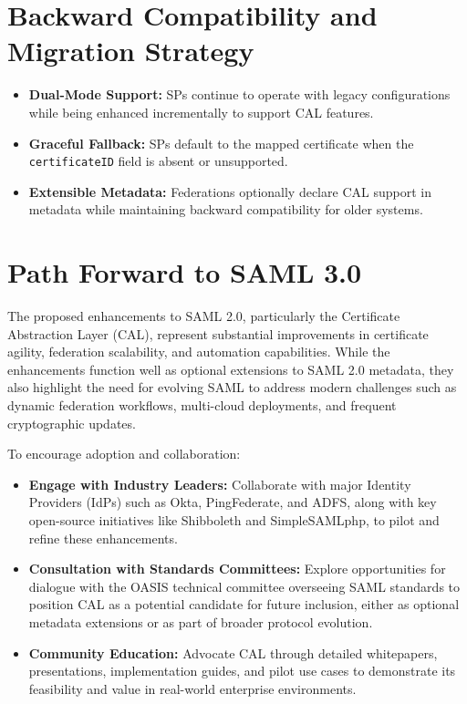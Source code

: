 \documentclass{article}
\begin{document}
\section*{Backward Compatibility and Migration Strategy}
\begin{itemize}
    \item \textbf{Dual-Mode Support:} SPs continue to operate with legacy configurations while being enhanced incrementally to support CAL features.
    \item \textbf{Graceful Fallback:} SPs default to the mapped certificate when the \texttt{certificateID} field is absent or unsupported.
    \item \textbf{Extensible Metadata:} Federations optionally declare CAL support in metadata while maintaining backward compatibility for older systems.
\end{itemize}

\section*{Path Forward to SAML 3.0}
The proposed enhancements to SAML 2.0, particularly the Certificate Abstraction Layer (CAL), represent substantial improvements in certificate agility, federation scalability, and automation capabilities. While the enhancements function well as optional extensions to SAML 2.0 metadata, they also highlight the need for evolving SAML to address modern challenges such as dynamic federation workflows, multi-cloud deployments, and frequent cryptographic updates.

To encourage adoption and collaboration:
\begin{itemize}
    \item \textbf{Engage with Industry Leaders:} Collaborate with major Identity Providers (IdPs) such as Okta, PingFederate, and ADFS, along with key open-source initiatives like Shibboleth and SimpleSAMLphp, to pilot and refine these enhancements.
    \item \textbf{Consultation with Standards Committees:} Explore opportunities for dialogue with the OASIS technical committee overseeing SAML standards to position CAL as a potential candidate for future inclusion, either as optional metadata extensions or as part of broader protocol evolution.
    \item \textbf{Community Education:} Advocate CAL through detailed whitepapers, presentations, implementation guides, and pilot use cases to demonstrate its feasibility and value in real-world enterprise environments.
\end{itemize}
\end{document}

